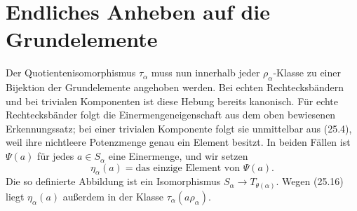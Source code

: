 \documentclass[main.tex]{subfiles}
\begin{document}
\begin{tabproofsplitwide}
  \closeproofpartwide
\end{tabproofsplitwide}
\endgroup

\section{Endliches Anheben auf die Grundelemente}

Der Quotientenisomorphismus \(\tau_\alpha\) muss nun innerhalb jeder
\(\rho_\alpha\)-Klasse zu einer Bijektion der Grundelemente angehoben
werden.  Bei echten Rechtecksbändern und bei trivialen Komponenten ist
diese Hebung bereits kanonisch.  Für echte Rechtecksbänder folgt die
Einermengeneigenschaft aus dem oben bewiesenen Erkennungssatz; bei einer
trivialen Komponente folgt sie unmittelbar aus (25.4), weil ihre
nichtleere Potenzmenge genau ein Element besitzt.  In beiden Fällen ist
\(\Psi(a)\) für jedes \(a\in S_\alpha\) eine Einermenge, und wir setzen
\[
  \eta_\alpha(a)=\text{das einzige Element von }\Psi(a).   \tag{25.24}
\]
Die so definierte Abbildung ist ein Isomorphismus
\(S_\alpha\to T_{\theta(\alpha)}\).  Wegen (25.16) liegt
\(\eta_\alpha(a)\) außerdem in der Klasse
\(\tau_\alpha(a\rho_\alpha)\).
\end{document}
